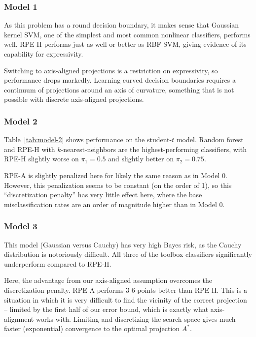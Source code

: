 \documentclass{amsart}
\begin{document}
\subsubsection{Model 1}

As this problem has a round decision boundary, it makes sense that Gaussian kernel SVM, one of the simplest and most common nonlinear classifiers, performs well.
RPE-H performs just as well or better as RBF-SVM, giving evidence of its capability for expressivity.

Switching to axis-aligned projections is a restriction on expressivity, so performance drops markedly. Learning curved decision boundaries requires a continuum of
projections around an axis of curvature, something that is not possible with discrete axis-aligned projections.

\subsubsection{Model 2}

Table~\ref{tab:model-2} shows performance on the student-$t$ model. Random forest and RPE-H with $k$-nearest-neighbors are the highest-performing classifiers,
with RPE-H slightly worse on $\pi_1=0.5$ and slightly better on $\pi_2=0.75$.

RPE-A is slightly penalized here for likely the same reason as in Model 0. However, this penalization seems to be constant (on the order of 1), so this
``discretization penalty'' has very little effect here, where the base misclassification rates are an order of magnitude higher than in Model 0.

\subsubsection{Model 3}

This model (Gaussian versus Cauchy) has very high Bayes risk, as the Cauchy distribution is notoriously difficult. All three of the toolbox classifiers
significantly underperform compared to RPE-H.

Here, the advantage from our axis-aligned assumption overcomes the discretization penalty. RPE-A performs 3-6 points better than RPE-H. This is a situation
in which it is very difficult to find the vicinity of the correct projection -- limited by the first half of our error bound, which is exactly what axis-
alignment works with. Limiting and discretizing the search space gives much faster (exponential) convergence to the optimal projection $A^*$.
\end{document}
